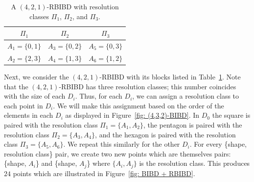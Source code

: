 \documentclass[12pt]{article}
\theoremstyle{definition}
\begin{document}
\begin{table}[ht]
    \begin{center}
        \begin{tabular}{c|c|c}
            $\Pi_1$ & $\Pi_2$ & $\Pi_3$ \\
            \hline
            $A_1 = \{0,1\}$ & $A_3 = \{0,2\}$ & $A_5 = \{0,3\}$ \\
            $A_2 = \{2,3\}$ & $A_4 = \{1,3\}$ & $A_6 = \{1,2\}$
        \end{tabular}
    \end{center}
    \caption{A $(4,2,1)$-RBIBD with resolution classes $\Pi_1$, $\Pi_2$, and $\Pi_3$.}
    \label{tab: (4,2,1)-RBIBD}
\end{table}

Next, we consider the $(4,2,1)$-RBIBD with its blocks listed in Table~\ref{tab: (4,2,1)-RBIBD}. Note that the $(4,2,1)$-RBIBD has three resolution classes; this number coincides with the size of each $D_i$. Thus, for each $D_i$, we can assign a resolution class to each point in $D_i$. We will make this assignment based on the order of the elements in each $D_i$ as displayed in Figure~\ref{fig: (4,3,2)-BIBD}. In $D_0$ the square is paired with the resolution class $\Pi_1 = \{A_1,A_2\}$, the pentagon is paired with the resolution class $\Pi_2 = \{A_3,A_4\}$, and the hexagon is paired with the resolution class $\Pi_3 = \{A_5,A_6\}$. We repeat this similarly for the other $D_i$. For every \{shape, resolution class\} pair, we create two new points which are themselves pairs: \{shape, $A_i$\} and \{shape, $A_j$\} where $\{A_i, A_j\}$ is the resolution class. This produces $24$ points which are illustrated in Figure~\ref{fig: BIBD + RBIBD}.
\end{document}
